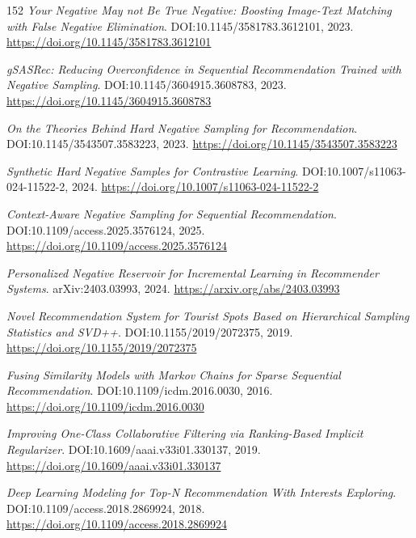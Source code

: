 \documentclass[11pt,a4paper]{article}
\begin{document}
\begin{thebibliography}{152}
\newblock \emph{Your Negative May not Be True Negative: Boosting Image-Text Matching with False Negative Elimination}.
\newblock DOI:10.1145/3581783.3612101, 2023.
\newblock \url{https://doi.org/10.1145/3581783.3612101}

\newblock \emph{gSASRec: Reducing Overconfidence in Sequential Recommendation Trained with Negative Sampling}.
\newblock DOI:10.1145/3604915.3608783, 2023.
\newblock \url{https://doi.org/10.1145/3604915.3608783}

\newblock \emph{On the Theories Behind Hard Negative Sampling for Recommendation}.
\newblock DOI:10.1145/3543507.3583223, 2023.
\newblock \url{https://doi.org/10.1145/3543507.3583223}

\newblock \emph{Synthetic Hard Negative Samples for Contrastive Learning}.
\newblock DOI:10.1007/s11063-024-11522-2, 2024.
\newblock \url{https://doi.org/10.1007/s11063-024-11522-2}

\newblock \emph{Context-Aware Negative Sampling for Sequential Recommendation}.
\newblock DOI:10.1109/access.2025.3576124, 2025.
\newblock \url{https://doi.org/10.1109/access.2025.3576124}

\newblock \emph{Personalized Negative Reservoir for Incremental Learning in Recommender Systems}.
\newblock arXiv:2403.03993, 2024.
\newblock \url{https://arxiv.org/abs/2403.03993}

\newblock \emph{Novel Recommendation System for Tourist Spots Based on Hierarchical Sampling Statistics and SVD++}.
\newblock DOI:10.1155/2019/2072375, 2019.
\newblock \url{https://doi.org/10.1155/2019/2072375}

\newblock \emph{Fusing Similarity Models with Markov Chains for Sparse Sequential Recommendation}.
\newblock DOI:10.1109/icdm.2016.0030, 2016.
\newblock \url{https://doi.org/10.1109/icdm.2016.0030}

\newblock \emph{Improving One-Class Collaborative Filtering via Ranking-Based Implicit Regularizer}.
\newblock DOI:10.1609/aaai.v33i01.330137, 2019.
\newblock \url{https://doi.org/10.1609/aaai.v33i01.330137}

\newblock \emph{Deep Learning Modeling for Top-N Recommendation With Interests Exploring}.
\newblock DOI:10.1109/access.2018.2869924, 2018.
\newblock \url{https://doi.org/10.1109/access.2018.2869924}


\end{thebibliography}
\end{document}
